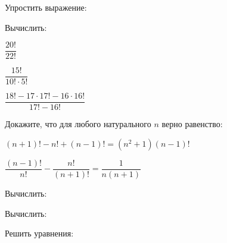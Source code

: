 \begin{listofex}
	\item Упростить выражение:
	\begin{enumcols}[itemcolumns=2]
		\item {}
		\item {}
		\item {}
	\end{enumcols}
	\item Вычислить:
	\begin{enumcols}[itemcolumns=3]
		\item \( \dfrac{20!}{22!} \) 
		\item \( \dfrac{15!}{10!\cdot5!} \) 
		\item \( \dfrac{18!-17\cdot17!-16\cdot16!}{17!-16!} \) 
	\end{enumcols}
	\item Докажите, что для любого натурального \( n \) верно равенство:
	\begin{enumcols}[itemcolumns=2]
		\item \( (n+1)!-n!+(n-1)! = (n^2+1)(n-1)! \)
		\item \( \dfrac{(n-1)!}{n!}-\dfrac{n!}{(n+1)!}=\dfrac{1}{n(n+1)} \)
	\end{enumcols}
	\item {}
	\item Вычислить:
	\begin{enumcols}[itemcolumns=2]
		\item {}
		\item {}
		\item {}
		\item {}
	\end{enumcols}
	\item Вычислить:
	\begin{enumcols}[itemcolumns=2]
		\item {}
		\item {}
	\end{enumcols}
	\item Решить уравнения:
	\begin{enumcols}[itemcolumns=2]
		\item {}
		\item {}
	\end{enumcols}
\end{listofex}